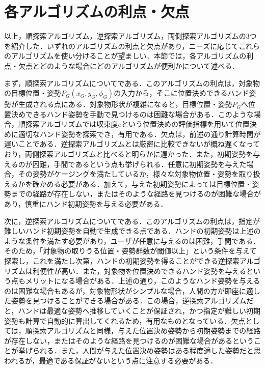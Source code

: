 \documentclass[a4paper,twoside,12pt,papersize, dvipdfmx]{iirthesis}
\begin{document}
{\section{各アルゴリズムの利点・欠点}
以上，順探索アルゴリズム，逆探索アルゴリズム，両側探索アルゴリズムの3つを紹介した．いずれのアルゴリズムの利点と欠点があり，ニーズに応じてこれらのアルゴリズムを使い分けることが望ましい．本節では，各アルゴリズムの利点・欠点とどのような場合にどのアルゴリズムが便利かについて述べる．\par

まず，順探索アルゴリズムについてである．このアルゴリズムの利点は，対象物の目標位置・姿勢$P_{G} (x_{G}, y_{G}, \phi_{G})$の入力から，そこに位置決めできるハンド姿勢が生成される点にある．対象物形状が複雑になると，目標位置・姿勢$P_G$へ位置決めできるハンド姿勢を手動で見つけるのは困難な場合がある．このような場合，順探索アルゴリズムでは収束度$e$という位置決めの評価指標を用いて位置決めに適切なハンド姿勢を探索でき，有用である．欠点は，前述の通り計算時間が遅いことである．逆探索アルゴリズムとは厳密に比較できないが概ね遅くなっており，両側探索アルゴリズムと比べると明らかに遅かった．また，初期姿勢を与えるのが困難，手間であるという点も挙げられる．任意に初期姿勢を与えた場合，その姿勢がケージングを満たしているか，様々な対象物位置・姿勢を取り扱えるかを確かめる必要がある．加えて，与えた初期姿勢によっては目標位置・姿勢までの経路が存在しない，またはそのような経路を見つけるのが困難な場合があり，慎重にハンド初期姿勢を与える必要がある．\par

次に，逆探索アルゴリズムについてである．このアルゴリズムの利点は，指定が難しいハンド初期姿勢を自動で生成できる点である．ハンドの初期姿勢は上述のような条件を満たす必要があり，ユーザが任意に与えるのは困難，手間である．そのため，「対象物の取りうる位置・姿勢群数が閾値以上」という条件を与えて探索し，これを満たし次第，ハンドの初期姿勢を得ることができる逆探索アルゴリズムは利便性が高い．また，対象物を位置決めできるハンド姿勢を与えるという点もメリットになる場合がある．上述の通り，このようなハンド姿勢を与えるのは困難な場合もあるが，対象物形状がシンプルな場合，人間の方が即座に適した姿勢を見つけることができる場合がある．この場合，逆探索アルゴリズムだと，ハンドは最適な姿勢へ推移していくことが保証され，かつ指定が難しい初期姿勢も計算で自動的に算出してくれるため，有用なものとなっている．欠点としては，順探索アルゴリズムと同様，与えた位置決め姿勢から初期姿勢までの経路が存在しない，またはそのような経路を見つけるのが困難な場合があるということが挙げられる．また，人間が与えた位置決め姿勢はある程度適した姿勢だと思われるが，最適である保証がないという点に注意する必要がある．\par

}
\end{document}
